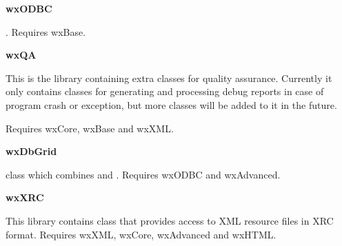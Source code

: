 {\large {\bf wxODBC}}

. Requires wxBase.

{\large {\bf wxQA}}

This is the library containing extra classes for quality assurance. Currently
it only contains classes for generating and processing debug reports in case of
program crash or exception, but more classes will be added to it in the future.

Requires wxCore, wxBase and wxXML.

{\large {\bf wxDbGrid}}

 class which combines 
  and . 
Requires wxODBC and wxAdvanced.

{\large {\bf wxXRC}}

This library contains  class that
provides access to XML resource files in XRC format.
Requires wxXML, wxCore, wxAdvanced and wxHTML.


